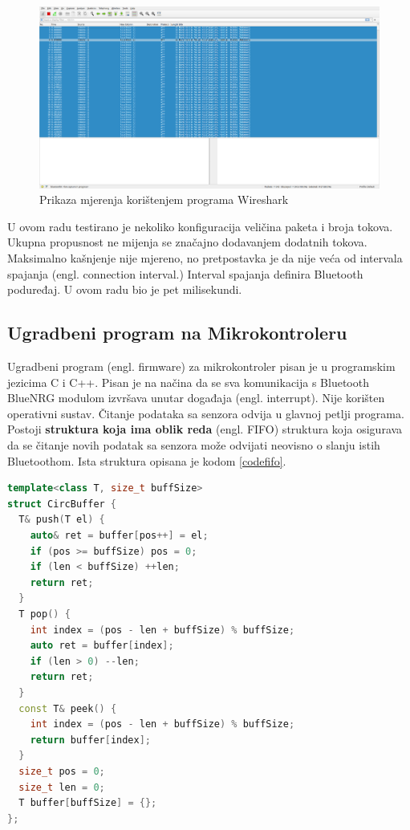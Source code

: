 \documentclass[times, utf8, diplomski]{diplomski}
\begin{document}
\begin{figure}[H]
\includegraphics[width=\textwidth]{wireshark_100sec_20230622_225645.png}
\centering
\caption{Prikaza mjerenja korištenjem programa Wireshark \cite{wireshark}}
\label{fig:wireshark}
\end{figure}

U ovom radu testirano je nekoliko konfiguracija veličina paketa i broja tokova. Ukupna propusnost ne mijenja se značajno dodavanjem dodatnih tokova. Maksimalno kašnjenje nije mjereno, no pretpostavka je da nije veća od intervala spajanja (engl. connection interval.) Interval spajanja definira Bluetooth poduređaj. U ovom radu bio je pet milisekundi.


\subsection{Ugradbeni program na Mikrokontroleru}
Ugradbeni program (engl. firmware) za mikrokontroler pisan je u programskim jezicima C i C++. Pisan je na načina da se sva komunikacija s Bluetooth BlueNRG modulom izvršava unutar događaja (engl. interrupt). Nije korišten operativni sustav. Čitanje podataka sa senzora odvija u glavnoj petlji programa. Postoji \textbf{struktura koja ima oblik reda} (engl. FIFO) struktura koja osigurava da se čitanje novih podatak sa senzora može odvijati neovisno o slanju istih Bluetoothom. Ista struktura opisana je kodom \ref{codefifo}.

\begin{lstlisting}[language=c++, caption={FIFO struktura koja omogućuje neovisan dohvat novih podataka i slanje najstarijih}, label={codefifo}]
template<class T, size_t buffSize>
struct CircBuffer {
  T& push(T el) {
    auto& ret = buffer[pos++] = el;
    if (pos >= buffSize) pos = 0;
    if (len < buffSize) ++len;
    return ret;
  }
  T pop() {
    int index = (pos - len + buffSize) % buffSize;
    auto ret = buffer[index];
    if (len > 0) --len;
    return ret;
  }
  const T& peek() {
    int index = (pos - len + buffSize) % buffSize;
    return buffer[index];
  }
  size_t pos = 0;
  size_t len = 0;
  T buffer[buffSize] = {};
};
\end{lstlisting}
\end{document}
